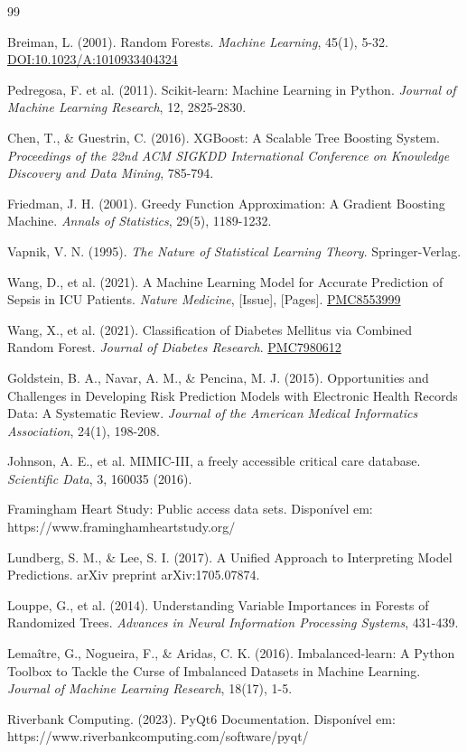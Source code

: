 \documentclass[12pt]{article}
\begin{document}
\begin{thebibliography}{99}

 Breiman, L. (2001). Random Forests. \textit{Machine Learning}, 45(1), 5-32.
\href{https://link.springer.com/article/10.1023/A:1010933404324}{DOI:10.1023/A:1010933404324}

 Pedregosa, F. et al. (2011). Scikit-learn: Machine Learning in Python. \textit{Journal of Machine Learning Research}, 12, 2825-2830.

 Chen, T., \& Guestrin, C. (2016). XGBoost: A Scalable Tree Boosting System. \textit{Proceedings of the 22nd ACM SIGKDD International Conference on Knowledge Discovery and Data Mining}, 785-794.

 Friedman, J. H. (2001). Greedy Function Approximation: A Gradient Boosting Machine. \textit{Annals of Statistics}, 29(5), 1189-1232.

 Vapnik, V. N. (1995). \textit{The Nature of Statistical Learning Theory}. Springer-Verlag.

 Wang, D., et al. (2021). A Machine Learning Model for Accurate Prediction of Sepsis in ICU Patients. \textit{Nature Medicine}, [Issue], [Pages].
\href{https://www.ncbi.nlm.nih.gov/pmc/articles/PMC8553999/}{PMC8553999}

 Wang, X., et al. (2021). Classification of Diabetes Mellitus via Combined Random Forest. \textit{Journal of Diabetes Research}.
\href{https://www.ncbi.nlm.nih.gov/pmc/articles/PMC7980612/}{PMC7980612}

 Goldstein, B. A., Navar, A. M., \& Pencina, M. J. (2015). Opportunities and Challenges in Developing Risk Prediction Models with Electronic Health Records Data: A Systematic Review. \textit{Journal of the American Medical Informatics Association}, 24(1), 198-208.

 Johnson, A. E., et al. MIMIC-III, a freely accessible critical care database. \textit{Scientific Data}, 3, 160035 (2016).

 Framingham Heart Study: Public access data sets. Disponível em: https://www.framinghamheartstudy.org/

 Lundberg, S. M., \& Lee, S. I. (2017). A Unified Approach to Interpreting Model Predictions. arXiv preprint arXiv:1705.07874.

 Louppe, G., et al. (2014). Understanding Variable Importances in Forests of Randomized Trees. \textit{Advances in Neural Information Processing Systems}, 431-439.

 Lemaître, G., Nogueira, F., \& Aridas, C. K. (2016). Imbalanced-learn: A Python Toolbox to Tackle the Curse of Imbalanced Datasets in Machine Learning. \textit{Journal of Machine Learning Research}, 18(17), 1-5.

 Riverbank Computing. (2023). PyQt6 Documentation. Disponível em: https://www.riverbankcomputing.com/software/pyqt/

\end{thebibliography}
\end{document}
